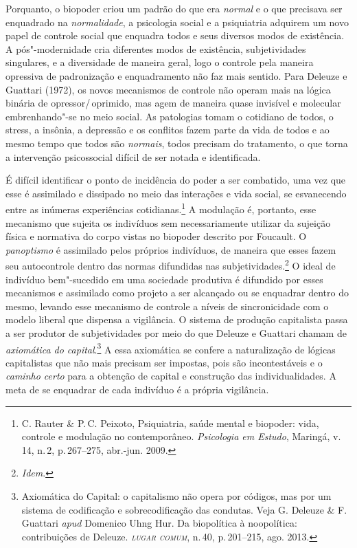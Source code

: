Porquanto, o biopoder criou um padrão do que era \textit{normal} e o que
precisava ser enquadrado na \textit{normalidade}, a psicologia social e a
psiquiatria adquirem um novo papel de controle social que enquadra todos
e seus diversos modos de existência. A pós"-modernidade cria diferentes
modos de existência, subjetividades singulares, e a diversidade de
maneira geral, logo o controle pela maneira opressiva de padronização e
enquadramento não faz mais sentido. Para Deleuze e Guattari (1972), os
novos mecanismos de controle não operam mais na lógica binária de
opressor/\,oprimido, mas agem de maneira quase invisível e molecular
embrenhando"-se no meio social. As patologias tomam o cotidiano de todos,
o stress, a insônia, a depressão e os conflitos fazem parte da vida de
todos e ao mesmo tempo que todos são \textit{normais}, todos precisam do
tratamento, o que torna a intervenção psicossocial difícil de ser notada
e identificada.

É difícil identificar o ponto de incidência do poder a ser combatido,
uma vez que esse é assimilado e dissipado no meio das interações e vida
social, se esvanecendo entre as inúmeras experiências cotidianas.\footnote{C. Rauter \& P.\,C. Peixoto, Psiquiatria, saúde mental e biopoder: vida, controle e modulação
no contemporâneo. \textit{Psicologia em Estudo}, Maringá, v.\, 14, n.\,2, p.\,267--275,
 abr.-jun. 2009.} A modulação é, portanto, esse mecanismo que
sujeita os indivíduos sem necessariamente utilizar da sujeição física e
normativa do corpo vistas no biopoder descrito por Foucault. O
\textit{panoptismo} é assimilado pelos próprios indivíduos, de maneira que esses
fazem seu autocontrole dentro das normas difundidas nas subjetividades.\footnote{\textit{Idem}.}
O ideal de indivíduo bem"-sucedido em
uma sociedade produtiva é difundido por esses mecanismos e assimilado
como projeto a ser alcançado ou se enquadrar dentro do mesmo, levando
esse mecanismo de controle a níveis de sincronicidade com o modelo
liberal que dispensa a vigilância. O sistema de produção capitalista
passa a ser produtor de subjetividades por meio do que Deleuze e
Guattari chamam de \textit{axiomática do capital}.\footnote{Axiomática do
  Capital: o capitalismo não opera por códigos, mas por um sistema de
  codificação e sobrecodificação das condutas. Veja G. Deleuze \& F. Guattari
\textit{apud} Domenico Uhng Hur. Da biopolítica à noopolítica: contribuições de Deleuze. \textit{\textsc{lugar comum}}, n.\,40, p.\,201--215, ago. 2013.} A essa axiomática se confere a
naturalização de lógicas capitalistas que não mais precisam ser
impostas, pois são incontestáveis e o \textit{caminho certo} para a obtenção
de capital e construção das individualidades. A meta de se enquadrar de
cada indivíduo é a própria vigilância.

